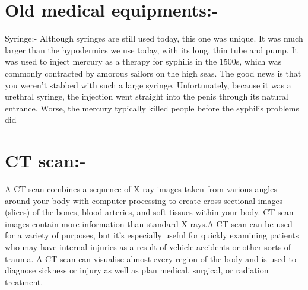 \documentclass[12pt]{article}
\begin{document}
\section{Old medical equipments:-}

Syringe:-
Although syringes are still used today, this one was unique. It was much larger than the hypodermics we use today, with its long, thin tube and pump. It was used to inject mercury as a therapy for syphilis in the 1500s, which was commonly contracted by amorous sailors on the high seas. The good news is that you weren't stabbed with such a large syringe. Unfortunately, because it was a urethral syringe, the injection went straight into the penis through its natural entrance. Worse, the mercury typically killed people before the syphilis problems did

\section{CT scan:-}
A CT scan combines a sequence of X-ray images taken from various angles around your body with computer processing to create cross-sectional images (slices) of the bones, blood arteries, and soft tissues within your body. CT scan images contain more information than standard X-rays.A CT scan can be used for a variety of purposes, but it's especially useful for quickly examining patients who may have internal injuries as a result of vehicle accidents or other sorts of trauma. A CT scan can visualise almost every region of the body and is used to diagnose sickness or injury as well as plan medical, surgical, or radiation treatment.
\end{document}
